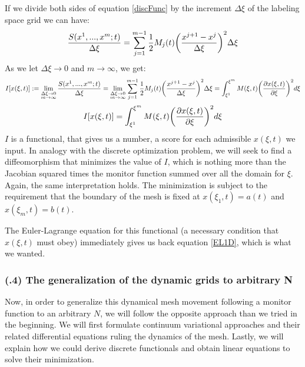 \documentclass[11pt, a4paper]{article} %
\begin{document}
If we divide both sides of equation \eqref{discFunc} by the increment $\Delta \xi$ of the labeling space grid we can have:
\begin{equation}
\frac{S( x^1,...,x^m;t)}{\Delta\xi}=\sum_{j=1}^{m-1} \frac{1}{2} M_j(t) \qty(\frac{x^{j+1}-x^j}{\Delta \xi})^2 \Delta \xi
\end{equation}
As we let $\Delta \xi \rightarrow 0$ and $m\rightarrow \infty$, we get:
\begin{equation}
I[x(\xi,t)]:=\lim\limits_{\substack{\Delta \xi \rightarrow 0\\ m \rightarrow \infty}}\frac{S( x^1,...,x^m;t)}{\Delta\xi}=\lim\limits_{\substack{\Delta \xi \rightarrow 0\\ m \rightarrow \infty}} \sum_{j=1}^{m-1}\frac{1}{2} M_j(t) \qty(\frac{x^{j+1}-x^j}{\Delta \xi})^2 \Delta \xi=\int_{\xi^1}^{\xi^m} M(\xi,t) \qty(\pdv{x(\xi,t)}{\xi})^2d\xi
\end{equation}
\begin{equation}\label{functional1D}
I[x(\xi,t)]=\int_{\xi^1}^{\xi^m} M(\xi,t) \qty(\pdv{x(\xi,t)}{\xi})^2d\xi
\end{equation}
$I$ is a functional, that gives us a number, a score for each admissible $x(\xi,t)$ we input. In analogy with the discrete optimization problem, we will seek to find a diffeomorphism that minimizes the value of $I$, which is nothing more than the Jacobian squared times the monitor function summed over all the domain for $\xi$. Again, the same interpretation holds. The minimization is subject to the requirement that the boundary of the mesh is fixed at $x(\xi_1,t)=a(t)$ and $x(\xi_m,t)=b(t)$.

The Euler-Lagrange equation for this functional (a necessary condition that $x(\xi,t)$ must obey) immediately gives us back equation \eqref{EL1D}, which is what we wanted.

\subsubsection*{\bf (\textgamma.4) The generalization of the dynamic grids to arbitrary N}

Now, in order to generalize this dynamical mesh movement following a monitor function to an arbitrary $N$, we will follow the opposite approach than we tried in the beginning. We will first formulate continuum variational approaches and their related differential equations ruling the dynamics of the mesh. Lastly, we will explain how we could derive discrete functionals and obtain linear equations to solve their minimization.
\end{document}

